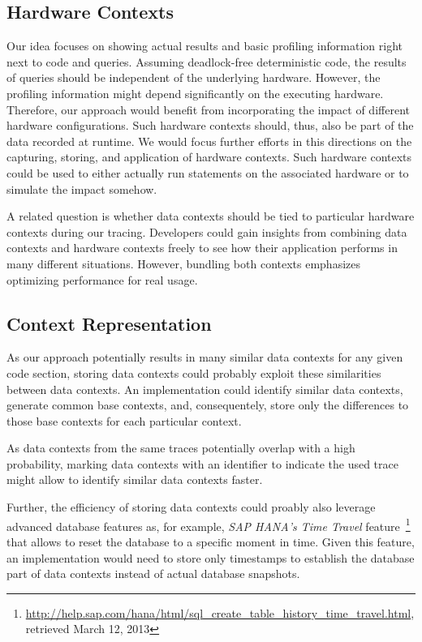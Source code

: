 \subsection{Hardware Contexts}
Our idea focuses on showing actual results and basic profiling information right next to code and queries.
Assuming deadlock-free deterministic code, the results of queries should be independent of the underlying hardware.
However, the profiling information might depend significantly on the executing hardware.
Therefore, our approach would benefit from incorporating the impact of different hardware configurations.
Such hardware contexts should, thus, also be part of the data recorded at runtime.
We would focus further efforts in this directions on the capturing, storing, and application of hardware contexts.
Such hardware contexts could be used to either actually run statements on the associated hardware or to simulate the impact somehow.

A related question is whether data contexts should be tied to particular hardware contexts during our tracing.
Developers could gain insights from combining data contexts and hardware contexts freely to see how their application performs in many different situations.
However, bundling both contexts emphasizes optimizing performance for real usage.

\subsection{Context Representation}
As our approach potentially results in many similar data contexts for any given code section, storing data contexts could probably exploit these similarities between data contexts.
An implementation could identify similar data contexts, generate common base contexts, and, consequentely, store only the differences to those base contexts for each particular context.

As data contexts from the same traces potentially overlap with a high probability, marking data contexts with an identifier to indicate the used trace might allow to identify similar data contexts faster.

Further, the efficiency of storing data contexts could proably also leverage advanced database features as, for example, \emph{SAP HANA's Time Travel} feature~\footnote{\url{http://help.sap.com/hana/html/sql_create_table_history_time_travel.html}, retrieved March 12, 2013} that allows to reset the database to a specific moment in time.
Given this feature, an implementation would need to store only timestamps to establish the database part of data contexts instead of actual database snapshots.
